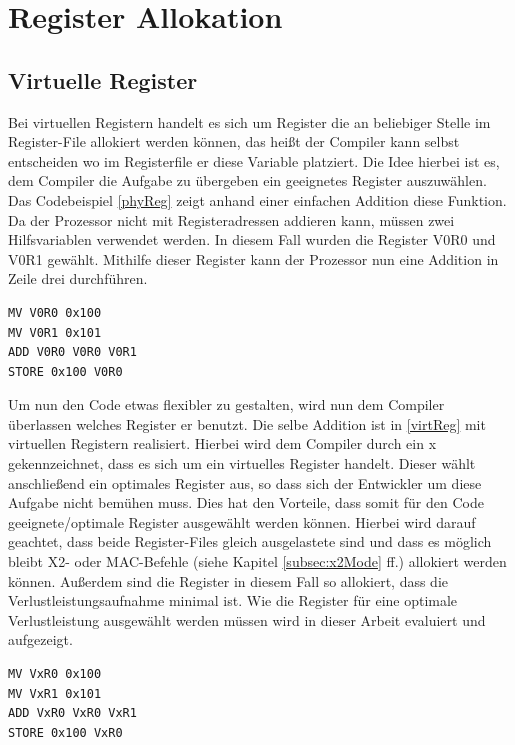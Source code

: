 \section{Register Allokation}
\label{sec:register allok}
\subsection{Virtuelle Register}
Bei virtuellen Registern handelt es sich um Register die an beliebiger Stelle im Register-File allokiert werden können, das heißt der Compiler kann selbst entscheiden wo im Registerfile er diese Variable platziert. 
Die Idee hierbei ist es, dem Compiler die Aufgabe zu übergeben ein geeignetes Register auszuwählen. Das Codebeispiel \ref{phyReg} zeigt anhand einer einfachen Addition diese Funktion. Da der Prozessor nicht mit Registeradressen addieren kann, müssen zwei Hilfsvariablen verwendet werden. In diesem Fall wurden die Register V0R0 und V0R1 gewählt. Mithilfe dieser Register kann der Prozessor nun eine Addition in Zeile drei durchführen.
\newpage
\renewcommand{\lstlistingname}{Codebeispiel}
\begin{lstlisting}[frame=single, caption={physikalische Register},captionpos=b,label=phyReg]
MV V0R0 0x100
MV V0R1 0x101
ADD V0R0 V0R0 V0R1
STORE 0x100 V0R0
\end{lstlisting}
Um nun den Code etwas flexibler zu gestalten, wird  nun dem Compiler überlassen welches Register er benutzt. Die selbe Addition ist in \ref{virtReg} mit virtuellen Registern realisiert. Hierbei wird dem Compiler durch ein  x gekennzeichnet, dass es sich um ein virtuelles Register handelt. Dieser wählt anschließend ein optimales Register aus, so dass sich der Entwickler um diese Aufgabe nicht bemühen muss. Dies hat den Vorteile, dass somit für den Code geeignete/optimale Register ausgewählt werden können. Hierbei wird darauf geachtet, dass beide Register-Files gleich ausgelastete sind und dass es möglich bleibt X2- oder MAC-Befehle (siehe Kapitel \ref{subsec:x2Mode} ff.) allokiert werden können. Außerdem sind die Register in diesem Fall so allokiert, dass die Verlustleistungsaufnahme minimal ist. Wie die Register für eine optimale Verlustleistung ausgewählt werden müssen wird in dieser Arbeit evaluiert und aufgezeigt.

\begin{lstlisting}[frame=single,caption={virtuelle Register},captionpos=b,label=virtReg]
MV VxR0 0x100
MV VxR1 0x101
ADD VxR0 VxR0 VxR1
STORE 0x100 VxR0
\end{lstlisting}
